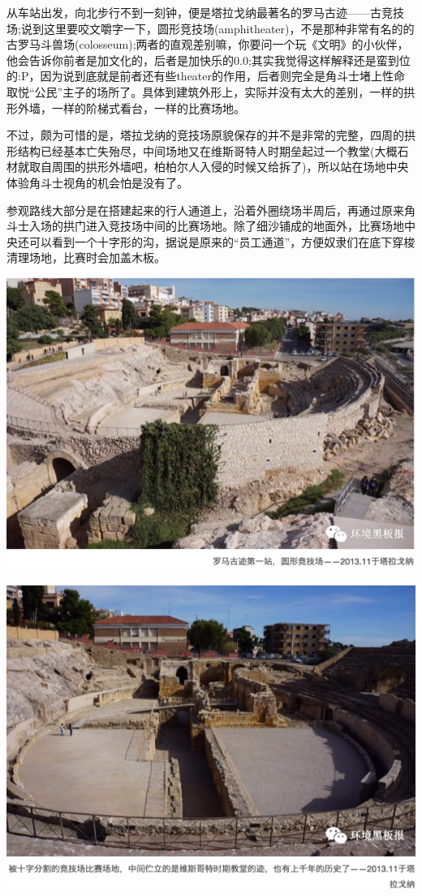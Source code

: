 \documentclass[]{book}
\begin{document}
从车站出发，向北步行不到一刻钟，便是塔拉戈纳最著名的罗马古迹------古竞技场;说到这里要咬文嚼字一下，圆形竞技场(amphitheater)，不是那种非常有名的的古罗马斗兽场(colosseum);两者的直观差别嘛，你要问一个玩《文明》的小伙伴，他会告诉你前者是加文化的，后者是加快乐的0.0;其实我觉得这样解释还是蛮到位的:P，因为说到底就是前者还有些theater的作用，后者则完全是角斗士堵上性命取悦``公民''主子的场所了。具体到建筑外形上，实际并没有太大的差别，一样的拱形外墙，一样的阶梯式看台，一样的比赛场地。

不过，颇为可惜的是，塔拉戈纳的竞技场原貌保存的并不是非常的完整，四周的拱形结构已经基本亡失殆尽，中间场地又在维斯哥特人时期垒起过一个教堂(大概石材就取自周围的拱形外墙吧，柏柏尔人入侵的时候又给拆了)，所以站在场地中央体验角斗士视角的机会怕是没有了。

参观路线大部分是在搭建起来的行人通道上，沿着外圈绕场半周后，再通过原来角斗士入场的拱门进入竞技场中间的比赛场地。除了细沙铺成的地面外，比赛场地中央还可以看到一个十字形的沟，据说是原来的``员工通道''，方便奴隶们在底下穿梭清理场地，比赛时会加盖木板。

\includegraphics[width=8.33in]{images/xt28}

\includegraphics[width=8.33in]{images/xt29}
\end{document}
